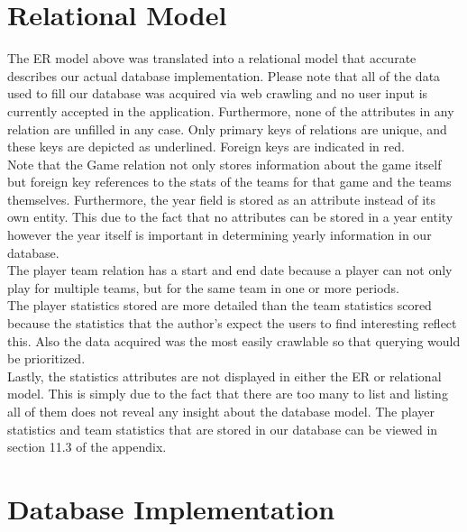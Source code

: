 \documentclass[12pt,letterpaper]{article}
\begin{document}



\section{Relational Model}
The ER model above was translated into a relational model that accurate describes our actual database implementation. Please note that all of the data used to fill our database was acquired via web crawling and no user input is currently accepted in the application. Furthermore, none of the attributes in any relation are unfilled in any case. Only primary keys of relations are unique, and these keys are depicted as underlined. Foreign keys are indicated in red. 
\\
Note that the Game relation not only stores information about the game itself but foreign key references to the stats of the teams for that game and the teams themselves. Furthermore, the year field is stored as an attribute instead of its own entity. This due to the fact that no attributes can be stored in a year entity however the year itself is important in determining yearly information in our database.
\\
The player team relation has a start and end date because a player can not only play for multiple teams, but for the same team in one or more periods.
\\
The player statistics stored are more detailed than the team statistics scored because the statistics that the author's expect the users to find interesting reflect this. Also the data acquired was the most easily crawlable so that querying would be prioritized.\\

Lastly, the statistics attributes are not displayed in either the ER or relational model. This is simply due to the fact that there are too many to list and listing all of them does not reveal any insight about the database model. The player statistics and team statistics that are stored in our database can be viewed in section 11.3 of the appendix. 




\section{Database Implementation}
\end{document}
